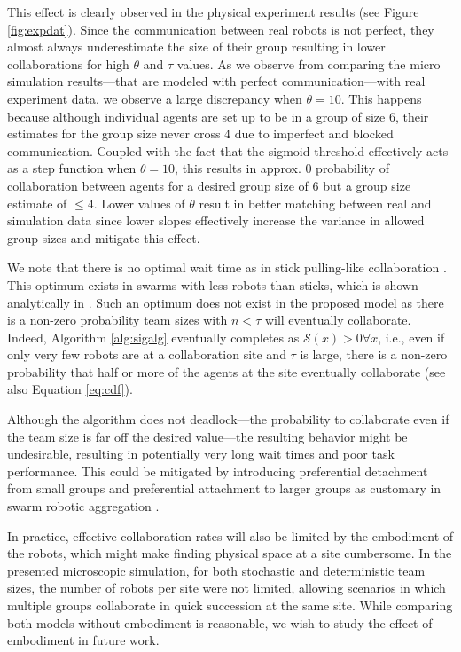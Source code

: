 \documentclass{svmult}  %
\newcommand{\sig}{\mathcal{S}}
\begin{document}
This effect is clearly observed in the physical experiment results (see Figure \ref{fig:expdat}). Since the communication between real robots is not perfect, they almost always  underestimate the size of their group resulting in lower collaborations for high $\theta$ and $\tau$ values. As we observe from comparing the micro simulation results---that are modeled with perfect communication---with real experiment data, we observe a large discrepancy when $\theta = 10$. This happens because although individual agents are set up to be in a group of size 6, their estimates for the group size never cross 4 due to imperfect and blocked communication. Coupled with the fact that the sigmoid threshold effectively acts as a step function when $\theta = 10$, this results in approx. 0 probability of collaboration between agents for a desired group size of 6 but a group size estimate of $\leq 4$. Lower values of $\theta$ result in better matching between real and simulation data since lower slopes effectively increase the variance in allowed group sizes and mitigate this effect.

We note that there is no optimal wait time as in stick pulling-like collaboration \cite{Lerman2001}. This optimum exists in swarms with less robots than sticks, which is shown analytically in \cite{Martinoli2004}. Such an optimum does not exist in the proposed model as there is a non-zero probability team sizes with $n<\tau$ will eventually collaborate. Indeed, Algorithm \ref{alg:sigalg} eventually completes as $\sig(x) > 0 \forall x$, i.e., even if only very few robots are at a collaboration site and $\tau$ is large, there is a non-zero probability that half or more of the agents at the site eventually collaborate (see also Equation \ref{eq:cdf}).

Although the algorithm does not deadlock---the probability to collaborate even if the team size is far off the desired value---the resulting behavior might be undesirable, resulting in potentially very long wait times and poor task performance. This could be mitigated by introducing preferential detachment from small groups and preferential attachment to larger groups as customary in swarm robotic aggregation \cite{correll2011modeling}.

In practice, effective collaboration rates will also be limited by the embodiment of the robots, which might make finding physical space at a site cumbersome. In the presented microscopic simulation, for both stochastic and deterministic team sizes, the number of robots per site were not limited, allowing scenarios in which multiple groups collaborate in quick succession at the same site. While comparing both models without embodiment is reasonable, we wish to study the effect of embodiment in future work.
\end{document}
